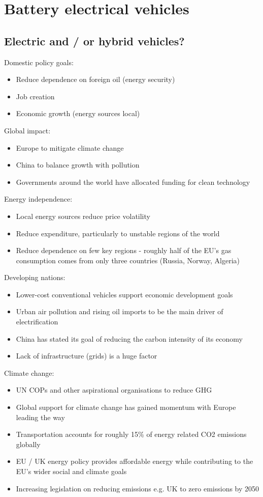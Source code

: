 \section{Battery electrical vehicles}
\subsection{Electric and / or hybrid vehicles?}
Domestic policy goals:
\begin{itemize}
    \item Reduce dependence on foreign oil (energy security)
    \item Job creation
    \item Economic growth (energy sources local)
\end{itemize}
Global impact:
\begin{itemize}
    \item Europe to mitigate climate change
    \item China to balance growth with pollution
    \item Governments around the world have allocated funding for clean technology
\end{itemize}
Energy independence:
\begin{itemize}
    \item Local energy sources reduce price volatility
    \item Reduce expenditure, particularly to unstable regions of the world
    \item Reduce dependence on few key regions - roughly half of the EU's gas consumption comes from only three countries (Russia, Norway, Algeria)
\end{itemize}
Developing nations:
\begin{itemize}
    \item Lower-cost conventional vehicles support economic development goals
    \item Urban air pollution and rising oil imports to be the main driver of electrification
    \item China has stated its goal of reducing the carbon intensity of its economy
    \item Lack of infrastructure (grids) is a huge factor
\end{itemize}
Climate change:
\begin{itemize}
    \item UN COPs and other aspirational organisations to reduce GHG
    \item Global support for climate change has gained momentum with Europe leading the way
    \item Transportation accounts for roughly 15\% of energy related CO2 emissions globally
    \item EU / UK energy policy provides affordable energy while contributing to the EU's wider social and climate goals
    \item Increasing legislation on reducing emissions e.g. UK to zero emissions by 2050
\end{itemize}
